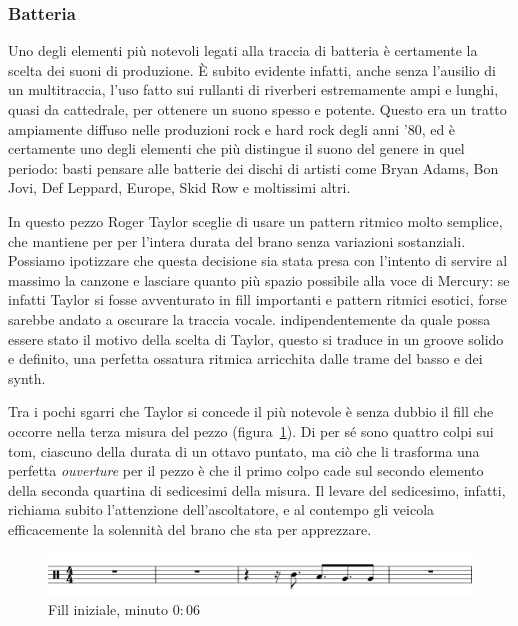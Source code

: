 \documentclass[12pt]{article}
\begin{document}
\subsubsection{Batteria}
Uno degli elementi più notevoli legati alla traccia di batteria è certamente la scelta dei suoni di produzione. È subito evidente infatti, anche senza l'ausilio di un multitraccia, l'uso fatto sui rullanti di riverberi estremamente ampi e lunghi, quasi da cattedrale, per ottenere un suono spesso e potente. Questo era un tratto ampiamente diffuso nelle produzioni rock e hard rock degli anni '\(80\), ed è certamente uno degli elementi che più distingue il suono del genere in quel periodo: basti pensare alle batterie dei dischi di artisti come Bryan Adams, Bon Jovi, Def Leppard, Europe, Skid Row e moltissimi altri.

In questo pezzo Roger Taylor sceglie di usare un pattern ritmico molto semplice, che mantiene per per l'intera durata del brano senza variazioni sostanziali. Possiamo ipotizzare che questa decisione sia stata presa con l'intento di servire al massimo la canzone e lasciare quanto più spazio possibile alla voce di Mercury: se infatti Taylor si fosse avventurato in fill importanti e pattern ritmici esotici, forse sarebbe andato a oscurare la traccia vocale. indipendentemente da quale possa essere stato il motivo della scelta di Taylor, questo si traduce in un groove solido e definito, una perfetta ossatura ritmica arricchita dalle trame del basso e dei synth.

Tra i pochi sgarri che Taylor si concede il più notevole è senza dubbio il fill che occorre nella terza misura del pezzo (figura~\ref{fig:drums}). Di per sé sono quattro colpi sui tom, ciascuno della durata di un ottavo puntato, ma ciò che li trasforma una perfetta \emph{ouverture} per il pezzo è che il primo colpo cade sul secondo elemento della seconda quartina di sedicesimi della misura. Il levare del sedicesimo, infatti, richiama subito l'attenzione dell'ascoltatore, e al contempo gli veicola efficacemente la solennità del brano che sta per apprezzare.

\begin{figure}[H]
 \centering
 \includegraphics[width=\textwidth,keepaspectratio]{drums/drums}
 \caption{Fill iniziale, minuto \(0:06\)}
 \label{fig:drums}
\end{figure}
\end{document}
